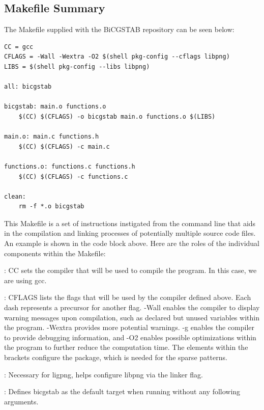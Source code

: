 \documentclass[12pt]{article}
\begin{document}
	\subsection{Makefile Summary}
	
	The Makefile supplied with the BiCGSTAB repository can be seen below:

 	\begin{mdframed}[style=myboxstyleTerminal1]
		\begin{verbatim}
CC = gcc
CFLAGS = -Wall -Wextra -O2 $(shell pkg-config --cflags libpng)
LIBS = $(shell pkg-config --libs libpng)

all: bicgstab

bicgstab: main.o functions.o
	$(CC) $(CFLAGS) -o bicgstab main.o functions.o $(LIBS)

main.o: main.c functions.h
	$(CC) $(CFLAGS) -c main.c

functions.o: functions.c functions.h
	$(CC) $(CFLAGS) -c functions.c

clean:
	rm -f *.o bicgstab
		\end{verbatim}
	\end{mdframed}

This Makefile is a set of instructions instigated from the command line that aids in the compilation and linking processes of potentially multiple source code files. An example is shown in the code block above. Here are the roles of the individual components within the Makefile:

: CC sets the compiler that will be used to compile the program. In this case, we are using gcc.

: CFLAGS lists the flags that will be used by the compiler defined above. Each dash represents a precursor for another flag.  -Wall enables the compiler to display warning messages upon compilation, such as declared but unused variables within the program. -Wextra provides more potential warnings. -g enables the compiler to provide debugging information, and -O2 enables possible optimizations within the program to further reduce the computation time. The elements within the brackets configure the  package, which is needed for the sparse patterns.

: Necessary for ligpng, helps configure libpng via the linker flag.

: Defines bicgstab as the default target when running  without any following arguments.
\end{document}
